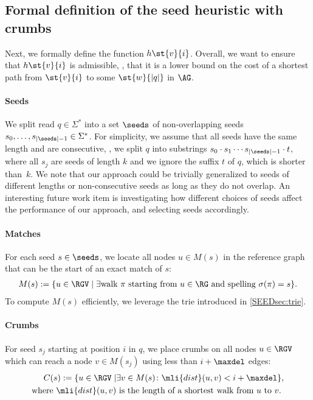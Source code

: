 \subsection{Formal definition of the seed heuristic with crumbs} \label{SEEDsec:definition}
%
Next, we formally define the \seedh function $h\st{v}{i}$. Overall, we want to
ensure that $h\st{v}{i}$ is admissible, \ie, that it is a lower bound on the
cost of a shortest path from $\st{v}{i}$ to some $\st{w}{|q|}$ in $\AG$.

\paragraph{Seeds}
%
We split read $q \in \Sigma^*$ into a set $\seeds$ of non-overlapping seeds
$s_0, \dots, s_{|\seeds|-1} \in \Sigma^*$.
%
For simplicity, we assume that all seeds have the same length and are
consecutive, \ie, we split $q$ into substrings $s_0 \cdot s_1 \cdots
s_{|\seeds|-1} \cdot t$, where all $s_j$ are seeds of length $k$ and we ignore
the suffix $t$ of $q$, which is shorter than~$k$.
%
We note that our approach could be trivially generalized to seeds of different
lengths or non-consecutive seeds as long as they do not overlap. An interesting
future work item is investigating how different choices of seeds affect the
performance of our approach, and selecting seeds accordingly.

\paragraph{Matches}
%
For each seed $s \in \seeds$, we locate all nodes $u \in M(s)$ in the reference
graph that can be the start of an exact match of $s$:
%
\begin{align*}
	M(s) := \{u \in \RGV \mid \exists \text{walk } \pi \text{ starting from } u \in \RG \text{ and spelling } \sigma(\pi) = s \}.
\end{align*}
%
To compute $M(s)$ efficiently, we leverage the trie introduced in
\cref{SEEDsec:trie}.

\paragraph{Crumbs}
For seed $s_j$ starting at position $i$ in $q$, we place crumbs on all nodes $u
\in \RGV$ which can reach a node $v \in M(s_j)$ using less than $i+\maxdel$
edges:
%
\begin{align*}
	C(s) := \{u \in \RGV \mid & \exists v \in M(s)\colon \mli{dist}(u, v) < i + \maxdel \},\\
	\text{where }\mli{dist}(u, v) &\text{ is the length of a shortest walk from } u \text{ to } v.
\end{align*}

